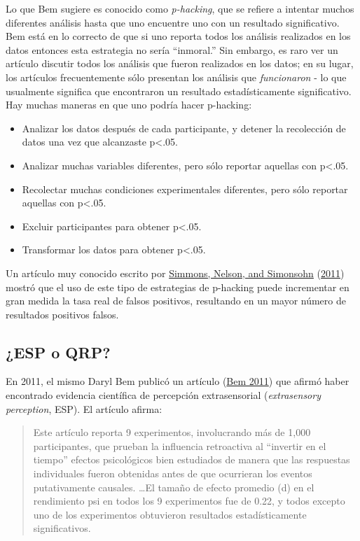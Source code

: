 \documentclass[
  12pt,
]{book}
\providecommand{\tightlist}{%
  \setlength{\itemsep}{0pt}\setlength{\parskip}{0pt}}
\begin{document}
Lo que Bem sugiere es conocido como \emph{p-hacking}, que se refiere a intentar muchos diferentes análisis hasta que uno encuentre uno con un resultado significativo. Bem está en lo correcto de que si uno reporta todos los análisis realizados en los datos entonces esta estrategia no sería ``inmoral.'' Sin embargo, es raro ver un artículo discutir todos los análisis que fueron realizados en los datos; en su lugar, los artículos frecuentemente sólo presentan los análisis que \emph{funcionaron} - lo que usualmente significa que encontraron un resultado estadísticamente significativo. Hay muchas maneras en que uno podría hacer p-hacking:

\begin{itemize}
\tightlist
\item
  Analizar los datos después de cada participante, y detener la recolección de datos una vez que alcanzaste p\textless.05.
\item
  Analizar muchas variables diferentes, pero sólo reportar aquellas con p\textless.05.
\item
  Recolectar muchas condiciones experimentales diferentes, pero sólo reportar aquellas con p\textless.05.
\item
  Excluir participantes para obtener p\textless.05.
\item
  Transformar los datos para obtener p\textless.05.
\end{itemize}

Un artículo muy conocido escrito por \protect\hyperlink{ref-simm:nels:simo:2011}{Simmons, Nelson, and Simonsohn} (\protect\hyperlink{ref-simm:nels:simo:2011}{2011}) mostró que el uso de este tipo de estrategias de p-hacking puede incrementar en gran medida la tasa real de falsos positivos, resultando en un mayor número de resultados positivos falsos.

\hypertarget{esp-o-qrp}{%
\subsection{¿ESP o QRP?}\label{esp-o-qrp}}

En 2011, el mismo Daryl Bem publicó un artículo (\protect\hyperlink{ref-bem:2011}{Bem 2011}) que afirmó haber encontrado evidencia científica de percepción extrasensorial (\emph{extrasensory perception}, ESP). El artículo afirma:

\begin{quote}
Este artículo reporta 9 experimentos, involucrando más de 1,000 participantes, que prueban la influencia retroactiva al ``invertir en el tiempo'' efectos psicológicos bien estudiados de manera que las respuestas individuales fueron obtenidas antes de que ocurrieran los eventos putativamente causales. \ldots El tamaño de efecto promedio (d) en el rendimiento psi en todos los 9 experimentos fue de 0.22, y todos excepto uno de los experimentos obtuvieron resultados estadísticamente significativos.
\end{quote}
\end{document}
